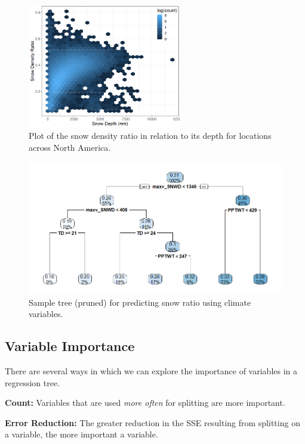 \documentclass[12pt]{notes}
\begin{document}
\begin{figure}[H]
\centering
\includegraphics[width = 0.6\textwidth]{figures/module4/snowRatio.png}
\caption{Plot of the snow density ratio in relation to its depth for locations across North America.}
\end{figure}

\begin{figure}[H]
\centering
\includegraphics[width = \textwidth]{figures/module4/sampleTree.png}
\caption{Sample tree (pruned) for predicting snow ratio using climate variables.}
\end{figure}

\subsection{Variable Importance}
There are several ways in which we can explore the importance of variables in a regression tree. 
\bi
\item \textbf{Count:} Variables that are used \textit{more often} for splitting are more important. 
\item \textbf{Error Reduction:} The greater reduction in the SSE resulting from splitting on a variable, the more important a variable. 
\ei
\end{document}
